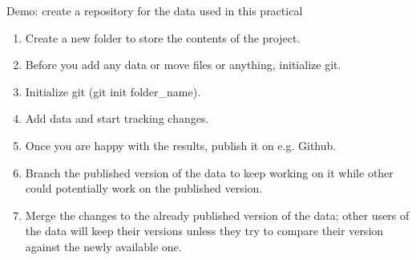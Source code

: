 \documentclass{beamer}
\begin{document}
\begin{frame}{Demo: create a repository for the data used in this practical}

  \begin{enumerate}
  
    \item Create a new folder to store the contents of the project.
    \pause
    \item Before you add any data or move files or anything, initialize git.
    \pause
    \item Initialize git (git init folder\_name).
    \pause
    \item Add data and start tracking changes.
    \pause
    \item Once you are happy with the results, publish it on e.g. Github.
    \pause
    \item Branch the published version of the data to keep working on it while other could potentially work on the published version.
    \pause
    \item Merge the changes to the already published version of the data; other users of the data will keep their versions unless they try to compare their version against the newly available one.

 \end{enumerate}

\end{frame}
\end{document}
